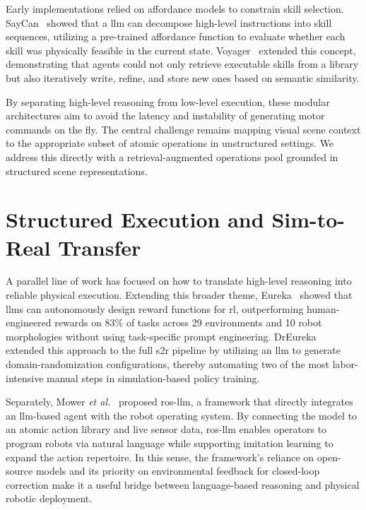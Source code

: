 \documentclass[
     12pt,
     a4paper,
     BCOR=10mm,
     DIV=14,
     listof=totoc,
     bibliography=totoc,
     parskip,
     twoside,
     headsepline
     ]{scrreprt}
\begin{document}
Early implementations relied on affordance models to constrain skill selection. SayCan~\cite{ahn2022icanisay} showed that a \gls{llm} can decompose high-level instructions into skill sequences, utilizing a pre-trained affordance function to evaluate whether each skill was physically feasible in the current state. Voyager~\cite{wang2023voyageropenendedembodiedagent} extended this concept, demonstrating that agents could not only retrieve executable skills from a library but also iteratively write, refine, and store new ones based on semantic similarity.

By separating high-level reasoning from low-level execution, these modular architectures aim to avoid the latency and instability of generating motor commands on the fly. The central challenge remains mapping visual scene context to the appropriate subset of atomic operations in unstructured settings. We address this directly with a retrieval-augmented operations pool grounded in structured scene representations.

\section{Structured Execution and Sim-to-Real Transfer}
A parallel line of work has focused on how to translate high-level reasoning into reliable physical execution. Extending this broader theme, Eureka~\cite{ma2024eurekahumanlevelrewarddesign} showed that \gls{llm}s can autonomously design reward functions for \gls{rl}, outperforming human-engineered rewards on 83\% of tasks across 29 environments and 10 robot morphologies without using task-specific prompt engineering. DrEureka~\cite{ma2024dreurekalanguagemodelguided} extended this approach to the full \gls{s2r} pipeline by utilizing an \gls{llm} to generate domain-randomization configurations, thereby automating two of the most labor-intensive manual steps in simulation-based policy training.

Separately, Mower \emph{et al.}~\cite{Mower_2026} proposed \gls{ros}-\gls{llm}, a framework that directly integrates an \gls{llm}-based agent with the robot operating system. By connecting the model to an atomic action library and live sensor data, \gls{ros}-\gls{llm} enables operators to program robots via natural language while supporting imitation learning to expand the action repertoire. In this sense, the framework's reliance on open-source models and its priority on environmental feedback for closed-loop correction make it a useful bridge between language-based reasoning and physical robotic deployment.
\end{document}
